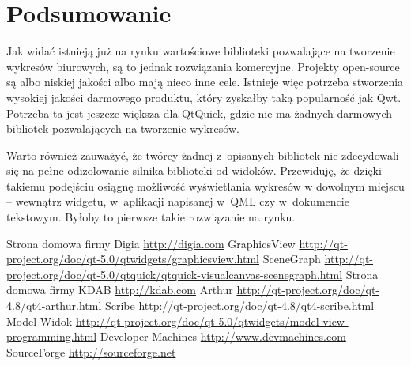 \section{Podsumowanie}
Jak widać istnieją już na rynku wartościowe biblioteki pozwalające na tworzenie wykresów biurowych, są to jednak rozwiązania komercyjne. Projekty open-source są albo niskiej jakości albo mają nieco inne cele. Istnieje więc potrzeba stworzenia wysokiej jakości darmowego produktu, który zyskałby taką popularność jak Qwt. Potrzeba ta jest jeszcze większa dla QtQuick, gdzie nie ma żadnych darmowych bibliotek pozwalających na tworzenie wykresów.\newline

Warto również zauważyć, że twórcy żadnej z~opisanych bibliotek nie zdecydowali się na pełne odizolowanie silnika biblioteki od widoków. Przewiduję, że dzięki takiemu podejściu osiągnę możliwość wyświetlania wykresów w dowolnym miejscu -- wewnątrz widgetu, w~aplikacji napisanej w~QML czy w~dokumencie tekstowym. Byłoby to pierwsze takie rozwiązanie na rynku.





\begin{thebibliography}{}
Strona domowa firmy Digia \url{http://digia.com}
GraphicsView \url{http://qt-project.org/doc/qt-5.0/qtwidgets/graphicsview.html}
SceneGraph \url{http://qt-project.org/doc/qt-5.0/qtquick/qtquick-visualcanvas-scenegraph.html}
Strona domowa firmy KDAB \url{http://kdab.com}
Arthur \url{http://qt-project.org/doc/qt-4.8/qt4-arthur.html}
Scribe \url{http://qt-project.org/doc/qt-4.8/qt4-scribe.html}
Model-Widok \url{http://qt-project.org/doc/qt-5.0/qtwidgets/model-view-programming.html}
Developer Machines \url{http://www.devmachines.com}
SourceForge \url{http://sourceforge.net}

\end{thebibliography}

